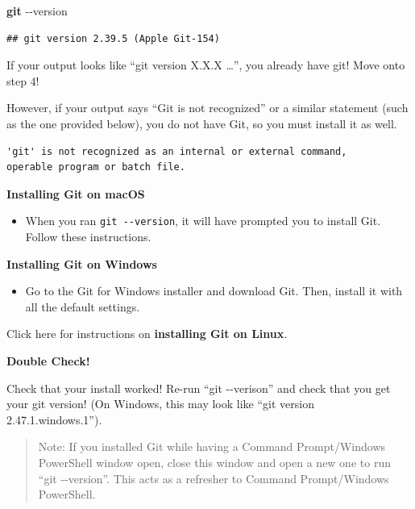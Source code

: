 \documentclass[
]{book}
\newenvironment{Shaded}{\begin{snugshade}}{\end{snugshade}}
\newcommand{\AttributeTok}[1]{\textcolor[rgb]{0.13,0.29,0.53}{#1}}
\newcommand{\FunctionTok}[1]{\textcolor[rgb]{0.13,0.29,0.53}{\textbf{#1}}}
\providecommand{\tightlist}{%
  \setlength{\itemsep}{0pt}\setlength{\parskip}{0pt}}
\newenvironment{greenbox}{
  \definecolor{shadecolor}{RGB}{141, 181, 128}
  \color{white}
  \begin{shaded}}
 {\end{shaded}}
\theoremstyle{definition}
\theoremstyle{definition}
\theoremstyle{definition}
\theoremstyle{definition}
\theoremstyle{remark}
\begin{document}
\begin{enumerate}
\begin{Shaded}
\begin{Highlighting}[]
\FunctionTok{git} \AttributeTok{{-}{-}version}
\end{Highlighting}
\end{Shaded}

\begin{verbatim}
## git version 2.39.5 (Apple Git-154)
\end{verbatim}

  If your output looks like ``git version X.X.X \ldots{}'', you already have git! Move onto step 4!

  However, if your output says ``Git is not recognized'' or a similar statement (such as the one provided below), you do not have Git, so you must install it as well.

\begin{verbatim}
'git' is not recognized as an internal or external command,
operable program or batch file.
\end{verbatim}

  \textbf{Installing Git on macOS}

  \begin{itemize}
  \tightlist
  \item
    When you ran \texttt{git\ -\/-version}, it will have prompted you to install Git. Follow these instructions.
  \end{itemize}

  \textbf{Installing Git on Windows}

  \begin{itemize}
  \tightlist
  \item
    Go to the Git for Windows installer and download Git. Then, install it with all the default settings.
  \end{itemize}

  Click here for instructions on \textbf{installing Git on Linux}.

  \begin{greenbox}

  \begin{center}
  \textbf{Double Check!}

  \end{center}

  Check that your install worked! Re-run ``git -\/-verison'' and check that you get your git version! (On Windows, this may look like ``git version 2.47.1.windows.1'').

  \begin{quote}
  Note: If you installed Git while having a Command Prompt/Windows PowerShell window open, close this window and open a new one to run ``git -\/-version''. This acts as a refresher to Command Prompt/Windows PowerShell.
  \end{quote}


\end{greenbox}
\end{enumerate}
\end{document}
